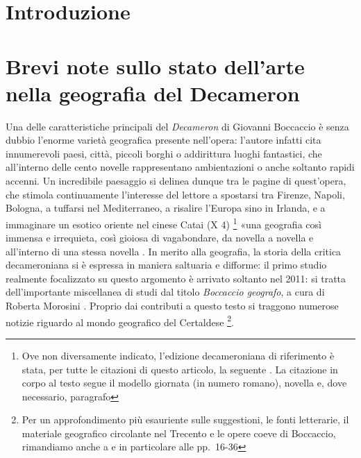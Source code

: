 \section{Introduzione}\label{introduzione}

\section{Brevi note sullo stato dell'arte nella geografia del
Decameron}\label{brevi-note-sullo-stato-dellarte-nella-geografia-del-decameron}

Una delle caratteristiche principali del \emph{Decameron} di Giovanni
Boccaccio è senza dubbio l'enorme varietà geografica presente
nell'opera: l'autore infatti cita innumerevoli paesi, città, piccoli
borghi o addirittura luoghi fantastici, che all'interno delle cento
novelle rappresentano ambientazioni o anche soltanto rapidi accenni. Un
incredibile paesaggio si delinea dunque tra le pagine di quest'opera,
che stimola continuamente l'interesse del lettore a spostarsi tra
Firenze, Napoli, Bologna, a tuffarsi nel Mediterraneo, a risalire
l'Europa sino in Irlanda, e a immaginare un esotico oriente nel cinese
Catai (X 4) \footnote{Ove non diversamente indicato, l'edizione
  decameroniana di riferimento è stata, per tutte le citazioni di questo
  articolo, la seguente \autocite{boccaccio2013decameron}. La citazione
  in corpo al testo segue il modello giornata (in numero romano),
  novella e, dove necessario, paragrafo} «una geografia così immensa e
irrequieta, così gioiosa di vagabondare, da novella a novella e
all'interno di una stessa novella \autocite{getto1972vita}. In merito
alla geografia, la storia della critica decameroniana si è espressa in
maniera saltuaria e difforme: il primo studio realmente focalizzato su
questo argomento è arrivato soltanto nel 2011: si tratta dell'importante
miscellanea di studi dal titolo \emph{Boccaccio geografo}, a cura di
Roberta Morosini \autocite{morosini2010boccaccio}. Proprio dai
contributi a questo testo si traggono numerose notizie riguardo al mondo
geografico del Certaldese \footnote{Per un approfondimento più
  esauriente sulle suggestioni, le fonti letterarie, il materiale
  geografico circolante nel Trecento e le opere coeve di Boccaccio,
  rimandiamo anche a \autocite{bolpagni2016} e in particolare alle
  pp.~16-36}.

